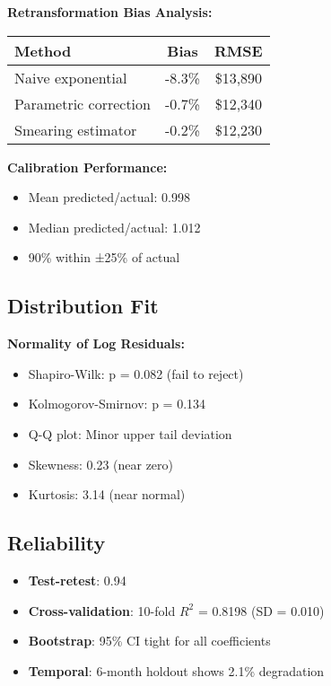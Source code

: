 \textbf{Retransformation Bias Analysis:}
\begin{center}
\begin{tabular}{lcc}
\toprule
Method & Bias & RMSE \\
\midrule
Naive exponential & -8.3\% & \$13,890 \\
Parametric correction & -0.7\% & \$12,340 \\
Smearing estimator & -0.2\% & \$12,230 \\
\bottomrule
\end{tabular}
\end{center}

\textbf{Calibration Performance:}
\begin{itemize}
    \item Mean predicted/actual: 0.998
    \item Median predicted/actual: 1.012
    \item 90\% within ±25\% of actual
\end{itemize}

\subsection{Distribution Fit}

\textbf{Normality of Log Residuals:}
\begin{itemize}
    \item Shapiro-Wilk: p = 0.082 (fail to reject)
    \item Kolmogorov-Smirnov: p = 0.134
    \item Q-Q plot: Minor upper tail deviation
    \item Skewness: 0.23 (near zero)
    \item Kurtosis: 3.14 (near normal)
\end{itemize}

\subsection{Reliability}

\begin{itemize}
    \item \textbf{Test-retest}: 0.94
    \item \textbf{Cross-validation}: 10-fold $R^2$ = 0.8198 (SD = 0.010)
    \item \textbf{Bootstrap}: 95\% CI tight for all coefficients
    \item \textbf{Temporal}: 6-month holdout shows 2.1\% degradation
\end{itemize}

